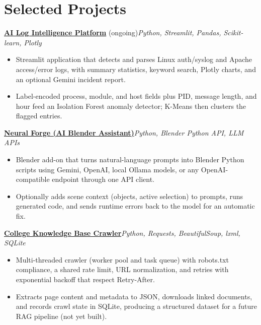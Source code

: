 \documentclass[11pt]{article}
\newcommand{\project}[4]{%
  \hspace*{6pt}\textbf{\href{#2}{#1}}#3\hfill\textit{#4}\par}
\newenvironment{projectitems}
  {\begin{itemize}[topsep=1pt, itemsep=0.5pt]}
  {\end{itemize}\vspace{4pt}}
\begin{document}
\section{Selected Projects}

\project{AI Log Intelligence Platform}{https://github.com/GurvirSinghH/AI-Log-Intelligence-Platform}%
  { (ongoing)}{Python, Streamlit, Pandas, Scikit-learn, Plotly}
\begin{projectitems}
  \item Streamlit application that detects and parses Linux auth/syslog and Apache access/error logs,
        with summary statistics, keyword search, Plotly charts, and an optional Gemini incident report.
  \item Label-encoded process, module, and host fields plus PID, message length, and hour feed an
        Isolation Forest anomaly detector; K-Means then clusters the flagged entries.
\end{projectitems}

\project{Neural Forge (AI Blender Assistant)}{https://github.com/GurvirSinghH/neural-forge}%
  {}{Python, Blender Python API, LLM APIs}
\begin{projectitems}
  \item Blender add-on that turns natural-language prompts into Blender Python scripts using Gemini,
        OpenAI, local Ollama models, or any OpenAI-compatible endpoint through one API client.
  \item Optionally adds scene context (objects, active selection) to prompts, runs generated code, and
        sends runtime errors back to the model for an automatic fix.
\end{projectitems}

\project{College Knowledge Base Crawler}{https://github.com/GurvirSinghH/college-rag-assistant}%
  {}{Python, Requests, BeautifulSoup, lxml, SQLite}
\begin{projectitems}
  \item Multi-threaded crawler (worker pool and task queue) with robots.txt compliance, a shared rate
        limit, URL normalization, and retries with exponential backoff that respect Retry-After.
  \item Extracts page content and metadata to JSON, downloads linked documents, and records crawl
        state in SQLite, producing a structured dataset for a future RAG pipeline (not yet built).
\end{projectitems}
\end{document}

